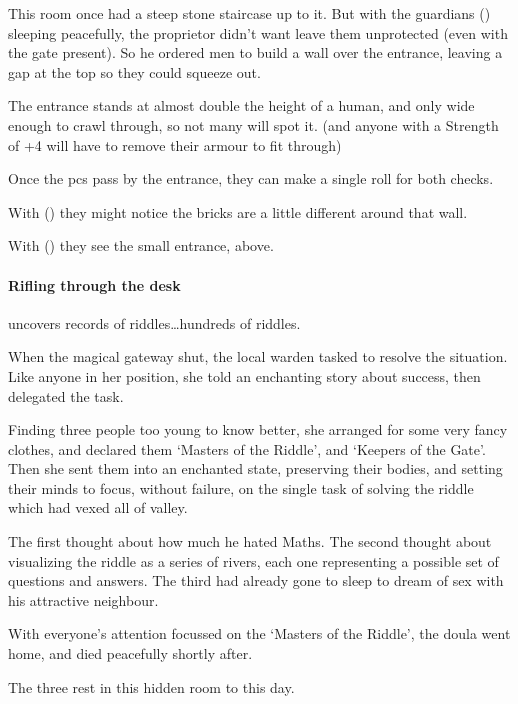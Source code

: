 \showStdSpells[
  \setcounter{diceNo}{0}
]


\begin{exampletext}
  This room once had a steep stone staircase up to it.
  But with the guardians () sleeping peacefully, the proprietor didn't want leave them unprotected (even with the gate present).
  So he ordered men to build a wall over the entrance, leaving a gap at the top so they could squeeze out.
\end{exampletext}

The entrance stands at almost double the height of a human, and only wide enough to crawl through, so not many will spot it.
(and anyone with a Strength of +4 will have to remove their armour to fit through)

Once the \glspl{pc} pass by the entrance, they can make a single roll for both checks.

With  (\tn[14]) they might notice the bricks are a little different around that wall.

With  (\tn[12]) they see the small entrance, above.

\paragraph{Rifling through the desk}
uncovers records of riddles\ldots hundreds of riddles.


\begin{exampletext}
  When the magical gateway shut, the local \gls{warden} tasked  to resolve the situation.
  Like anyone in her position, she told an enchanting story about success, then delegated the task.

  Finding three people too young to know better, she arranged for some very fancy clothes, and declared them `Masters of the Riddle', and `Keepers of the Gate'.
  Then she sent them into an enchanted state, preserving their bodies, and setting their minds to focus, without failure, on the single task of solving the riddle which had vexed all of \gls{valley}.

  The first thought about how much he hated Maths.
  The second thought about visualizing the riddle as a series of rivers, each one representing a possible set of questions and answers.
  The third had already gone to sleep to dream of sex with his attractive neighbour.

  With everyone's attention focussed on the `Masters of the Riddle', the \gls{doula} went home, and died peacefully shortly after.

  The three rest in this hidden room to this day.
\end{exampletext}

